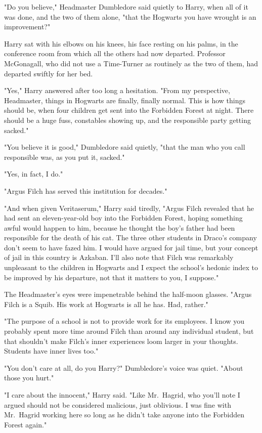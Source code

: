 "Do you believe," Headmaster Dumbledore said quietly to Harry, when all of it
was done, and the two of them alone, "that the Hogwarts you have wrought is an
improvement?"

Harry sat with his elbows on his knees, his face resting on his palms, in the
conference room from which all the others had now departed. Professor
McGonagall, who did not use a Time-Turner as routinely as the two of them, had
departed swiftly for her bed.

"Yes," Harry answered after too long a hesitation. "From my perspective,
Headmaster, things in Hogwarts are finally, finally normal. This is how things
should be, when four children get sent into the Forbidden Forest at night.
There should be a huge fuss, constables showing up, and the responsible party
getting sacked."

"You believe it is good," Dumbledore said quietly, "that the man who you call
responsible was, as you put it, sacked."

"Yes, in fact, I do."

"Argus Filch has served this institution for decades."

"And when given Veritaserum," Harry said tiredly, "Argus Filch revealed that he
had sent an eleven-year-old boy into the Forbidden Forest, hoping something
awful would happen to him, because he thought the boy's father had been
responsible for the death of his cat. The three other students in Draco's
company don't seem to have fazed him. I would have argued for jail time, but
your concept of jail in this country is Azkaban. I'll also note that Filch was
remarkably unpleasant to the children in Hogwarts and I expect the school's
hedonic index to be improved by his departure, not that it matters to you, I
suppose."

The Headmaster's eyes were impenetrable behind the half-moon glasses. "Argus
Filch is a Squib. His work at Hogwarts is all he has. Had, rather."

"The purpose of a school is not to provide work for its employees. I know you
probably spent more time around Filch than around any individual student, but
that shouldn't make Filch's inner experiences loom larger in your thoughts.
Students have inner lives too."

"You don't care at all, do you Harry?" Dumbledore's voice was quiet. "About
those you hurt."

"I care about the innocent," Harry said. "Like Mr.~Hagrid, who you'll note I
argued should not be considered malicious, just oblivious. I was fine with
Mr.~Hagrid working here so long as he didn't take anyone into the Forbidden
Forest again."

